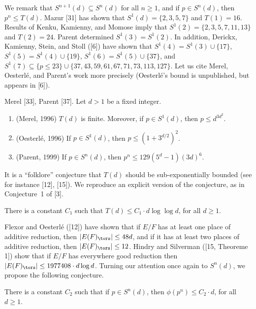 We remark that $S^{n+1}(d) \subseteq S^n(d)$ for all $n \geq 1$, and if $p \in S^n(d)$, then $p^n \leq T(d)$. Mazur [31] has shown that $S^1(d)= \{ 2,3,5,7 \}$ and $T(1)= 16$. Results of Kenku, Kamienny, and Momose imply that $S^1(2)= \{ 2,3,5,7,11,13 \}$ and $T(2)= 24$. Parent determined $S^1(3)= S^1(2)$. In addition, Derickx, Kamienny, Stein, and Stoll ([6]) have shown that $S^1(4)= S^1(3) \cup \{17\}$, $S^1(5)= S^1(4) \cup \{19\}$, $S^1(6)= S^1(5) \cup \{37\}$, and $S^1(7) \subseteq \{ p \leq 23 \} \cup \{ 37,43,59,61,67,71,73,113,127 \}$. Let us cite Merel, Oesterl\'e, and Parent’s work more precisely (Oesterl\'e's bound is unpublished, but appears in [6]).


\begin{thm} %
Merel [33], Parent [37]. Let $d > 1$ be a fixed integer.
	\begin{enumerate}[(1)]
	\item (Merel, 1996) $T(d)$ is finite. Moreover, if $p \in S^1(d)$, then $p \leq d^{3d^2}$.
	\item (Oesterl\'e, 1996) If $p \in S^1(d)$, then $p \leq (1 + 3^{d/2})^2$.
	\item (Parent, 1999) If $p \in S^n(d)$, then $p^n \leq 129(5^d - 1)(3d)^6$. 
	\end{enumerate}
\end{thm}


It is a ``folklore'' conjecture that $T(d)$ should be sub-exponentially bounded (see for instance [12], [15]). We reproduce an explicit version of the conjecture, as in Conjecture~1 of [3].


\begin{conj} %
There is a constant $C_1$ such that $T(d) \leq C_1 \cdot d \log \log d$, for all $d \geq 1$.
\end{conj}


Flexor and Oesterl\'e ([12]) have shown that if $E/F$ has at least one place of additive reduction, then $|E(F)_\tors| \leq 48d$, and if it has at least two places of additive reduction, then $|E(F)_\tors| \leq 12$. Hindry and Silverman ([15, Theoreme 1]) show that if $E/F$ has everywhere good reduction then $|E(F)_\tors| \leq 1977408 \cdot d \log d$. Turning our attention once again to $S^n(d)$, we propose the following conjecture. 


\begin{conj} %
There is a constant $C_2$ such that if $p \in S^n(d)$, then $\phi(p^n) \leq C_2 \cdot d$, for all $d \geq 1$. 
\end{conj}


